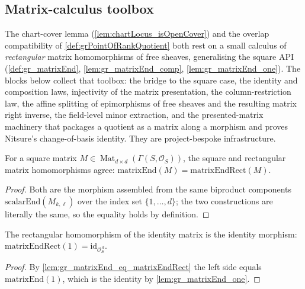 \subsection{Matrix-calculus toolbox}

The chart-cover lemma (\cref{lem:chartLocus_isOpenCover}) and the overlap compatibility of
\cref{def:grPointOfRankQuotient} both rest on a small calculus of \emph{rectangular} matrix
homomorphisms of free sheaves, generalising the square API
(\cref{def:gr_matrixEnd}, \cref{lem:gr_matrixEnd_comp}, \cref{lem:gr_matrixEnd_one}). The
blocks below collect that toolbox: the bridge to the square case, the identity and
composition laws, injectivity of the matrix presentation, the column-restriction law, the
affine splitting of epimorphisms of free sheaves and the resulting matrix right inverse, the
field-level minor extraction, and the presented-matrix machinery that packages a quotient as
a matrix along a morphism and proves Nitsure's change-of-basis identity. They are
project-bespoke infrastructure.

\begin{lemma}
  \label{lem:gr_matrixEnd_eq_matrixEndRect}
  For a square matrix \(M \in \operatorname{Mat}_{d\times d}(\Gamma(S,\mathcal{O}_S))\), the
  square and rectangular matrix homomorphisms agree:
  \(\mathrm{matrixEnd}(M) = \mathrm{matrixEndRect}(M)\).
\end{lemma}
\begin{proof}
  Both are the morphism assembled from the same biproduct components
  \(\mathrm{scalarEnd}(M_{k,\ell})\) over the index set \(\{1,\dots,d\}\); the two
  constructions are literally the same, so the equality holds by definition.
\end{proof}

\begin{lemma}
  \label{lem:gr_matrixEndRect_one}
  The rectangular homomorphism of the identity matrix is the identity morphism:
  \(\mathrm{matrixEndRect}(1) = \mathrm{id}_{\mathcal{O}_S^{\,d}}\).
\end{lemma}
\begin{proof}
  By \cref{lem:gr_matrixEnd_eq_matrixEndRect} the left side equals \(\mathrm{matrixEnd}(1)\),
  which is the identity by \cref{lem:gr_matrixEnd_one}.
\end{proof}

